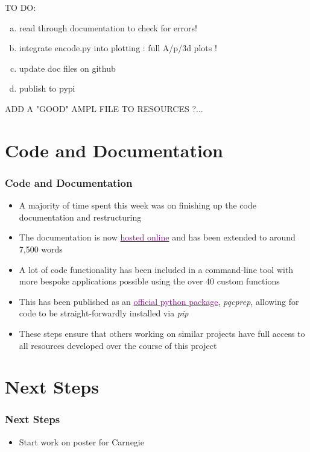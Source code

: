\documentclass{beamer}
\begin{document}
\begin{frame}

TO DO:
\begin{enumerate}[(a)]
\item read through documentation to check for errors!
\item integrate encode.py into plotting :  full A/p/3d plots !
\item update doc files on github 
\item publish to pypi 
\end{enumerate}

 
ADD A "GOOD" AMPL FILE TO RESOURCES ?... 
 
 
\end{frame}

\section{Code and Documentation}

\begin{frame}
\frametitle{Code and Documentation}
\begin{itemize}
\item A majority of time spent this week was on finishing up the code documentation and restructuring
\item The \alert{documentation} is now \href{https://david-f-amorim.github.io/PQC_function_evaluation/pqcprep.html}{\textcolor{purple}{hosted online}} and has been extended to around \alert{7,500 words} 
\item A lot of code functionality has been included in a \alert{command-line tool} with more bespoke applications possible using the over \alert{40 custom functions}
\item This has been \alert{published} as an \href{https://pypi.org/project/pqcprep/}{\textcolor{purple}{official python package}}, \emph{\alert{pqcprep}}, allowing for code to be straight-forwardly installed via \emph{pip} 
\item These steps ensure that others working on similar projects have \alert{full access to all resources} developed over the course of this project
\end{itemize}


\end{frame}

\section{Next Steps}

\begin{frame}
\frametitle{Next Steps}

\begin{itemize}
\item Start work on poster for Carnegie 
\end{itemize}

\end{frame}
\end{document}

